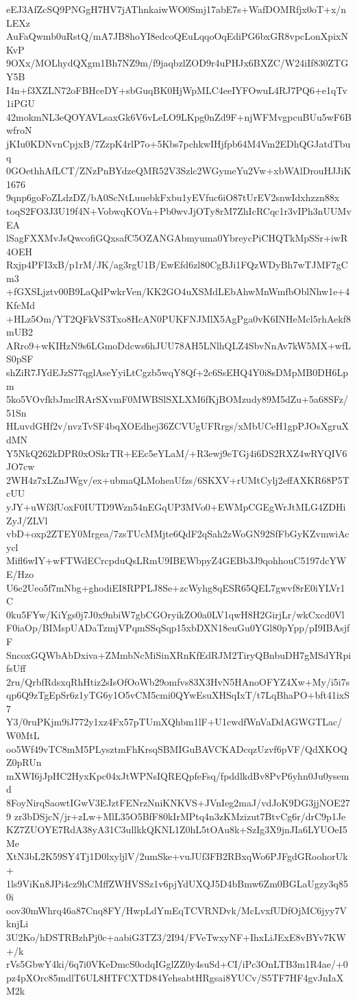 eEJ3AfZcSQ9PNGgH7HV7jAThnkaiwWO0Smj17abE7s+WafDOMRfjx0oT+x/nLEXz
AuFaQwmb0uRstQ/mA7JB8hoYI8edcoQEuLqqoOqEdiPG6bxGR8vpcLonXpixNKvP
9OXx/MOLhydQXgm1Bh7NZ9m/f9jaqbzlZOD9r4uPHJx6BXZC/W24iIf830ZTGY5B
I4n+f3XZLN72oFBHceDY+sbGuqBK0HjWpMLC4eeIYFOwuL4RJ7PQ6+e1qTv1iPGU
42mokmNL3eQOYAVLsaxGk6V6vLeLO9LKpg0nZd9F+njWFMvgpcuBUu5wF6BwfroN
jKIu0KDNvnCpjxB/7ZzpK4rlP7o+5Kbs7pchkwIHjfpb64M4Vm2EDhQGJatdTbuq
0GOethhAfLCT/ZNzPnBYdzeQMR52V3Szlc2WGymeYu2Vw+xbWAlDrouHJJiK1676
9qnp6goFoZLdzDZ/bA0ScNtLuuebkFxbu1yEVfuc6iO87tUrEV2snwIdxhzzn88x
toqS2FO3J3U19f4N+VobwqKOVn+Pb0wvJjOTy8rM7ZhIcRCqc1r3vIPh3nUUMvEA
lSagFXXMvJsQwcofiGQxsafC5OZANGAbmyuma0YbreycPiCHQTkMpSSr+iwR4OEH
Rxjp4PFI3xB/p1rM/JK/ag3rgU1B/EwEfd6zl80CgBJi1FQzWDyBh7wTJMF7gCm3
+fGXSLjztv00B9LaQdPwkrVen/KK2GO4uXSMdLEbAhwMnWmfbOblNhw1e+4KfcMd
+HLz5Om/YT2QFkVS3Txo8HcAN0PUKFNJMlX5AgPga0vK6INHeMcl5rhAekf8mUB2
ARro9+wKIHzN9s6LGmoDdcws6hJUU78AH5LNlhQLZ4SbvNnAv7kW5MX+wfLS0pSF
shZiR7JYdEJzS77qglAseYyiLtCgzb5wqY8Qf+2c6SsEHQ4Y0i8sDMpMB0DH6Lpm
5ko5VOvfkbJmclRArSXvmF0MWBSlSXLXM6fKjBOMzudy89M5dZu+5a68SFz/51Sn
HLuvdGHf2v/nvzTvSF4bqXOEdhej36ZCVUgUFRrgs/xMbUCeH1gpPJOsXgruXdMN
Y5NkQ262kDPR0xOSkrTR+EEc5eYLaM/+R3ewj9eTGj4i6DS2RXZ4wRYQIV6JO7cw
2WH4z7xLZnJWgv/ex+ubmaQLMoheaUfzs/6SKXV+rUMtCylj2effAXKR68P5TcUU
yJY+uWf3fUoxF0IUTD9Wzn54nEGqUP3MVo0+EWMpCGEgWrJtMLG4ZDHiZyJ/ZLVl
vbD+oxp2ZTEY0Mrgea/7zsTUcMMjte6QdF2qSah2zWoGN92SfFbGyKZvmwiAcycl
Mifl6wIY+wFTWdECrcpduQsLRmU9IBEWbpyZ4GEBb3J9qohhouC5197dcYWE/Hzo
U6e2Ueo5f7mNbg+ghodiEI8RPPLJ8Se+zcWyhg8qESR65QEL7gwvf8rE0iYLVr1C
0ku5FYw/KiYgs0j7J0x9nbiW7gbCGOryikZO0a0LV1qwH8H2GirjLr/wkCxcd0Vl
F0iaOp/BIMspUADaTzmjVPqmSSqSqp15xbDXN18euGu0YGl80pYpp/pI9IBAsjfF
SncoxGQWbAbDxiva+ZMmbNcMiSinXRnKfEdRJM2TiryQBnbuDH7gMSdYRpifsUff
2ru/QrbfRdsxqRhHtiz2sIsOfOoWb29omfvs83X3HvN5HAnoOFYZ4Xw+My/i5i7s
qp6Q9zTgEpSr6z1yTG6y1O5vCM5cmi0QYwEsuXHSqIxT/t7LqBhaPO+bft41ixS7
Y3/0ruPKjm9iJ772y1xz4Fx57pTUmXQhbm1lF+U1cwdfWnVaDdAGWGTLac/W0MtL
oo5Wf49vTC8mM5PLysztmFhKrsqSBMIGuBAVCKADcqzUzvf6pVF/QdXKOQZ0pRUn
mXWI6jJpHC2HyxKpc04xJtWPNsIQREQpfeFsq/fpddlkdBv8PvP6yhn0Ju0ysemd
8FoyNirqSaowtIGwV3EJztFENrzNniKNKVS+JVnIeg2maJ/vdJoK9DG3jjNOE279
zr3bDSjcN/jr+zLw+MlL35O5BfF80kIrMPtq4n3zKMzizut7BtvCg6r/drC9p1Je
KZ7ZUOYE7RdA38yA31C3ullkkQKNL1Z0hL5tOAu8k+SzIg3X9jnJIa6LYUOeI5Me
XtN3bL2K59SY4Tj1D0lxyljlV/2umSke+vuJUf3FB2RBxqWo6PJFgdGRoohorUk+
1ls9ViKn8JPi4cz9hCMffZWHVSSz1v6pjYdUXQJ5D4bBmw6Zm0BGLaUgzy3q850i
oov30mWhrq46a87Cnq8FY/HwpLdYmEqTCVRNDvk/McLvxfUDfOjMC6jyy7VknjLi
3U2Ko/hDSTRBzhPj0c+aabiG3TZ3/2I94/FVeTwxyNF+IhxLiJExE8vBYv7KW+/k
rVs5GbwY4ki/6q7i0VKeDmcS0odqIGglZZ0y4suSd+CI/iPc3OnLTB3m1R4ae/+0
pz4pXOrc85mdlT6UL8HTFCXTD84YehsabtHRgsai8YUCv/S5TF7HF4gvJnIaXM2k
